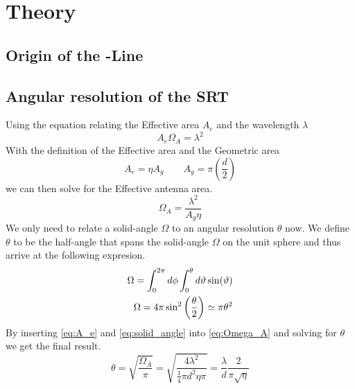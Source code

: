 
\section{Theory}




\subsection[Origin of the HI-Line]{Origin of the -Line}

\subsection{Angular resolution of the SRT}
Using the equation relating the Effective area $A_e$ and the wavelength $\lambda$ \cite[p. 149 (7.11)]{wilson}
\begin{equation}
    A_e \Omega_A = \lambda^2
\end{equation}
With the definition of the Effective area and the Geometric area
\begin{equation}
    A_e = \eta A_g \qquad A_g = \pi \left( \frac{d}{2} \right) \label{eq:A_e}
\end{equation}
we can then solve for the Effective antenna area.
\begin{equation}
    \Omega_A = \frac{\lambda^2}{A_g \eta} \label{eq:Omega_A}
\end{equation}
We only need to relate a solid-angle $\Omega$ to an angular resolution $\theta$ now. We define $\theta$ to be the half-angle that spans the solid-angle $\Omega$ on the unit sphere and thus arrive at the following expresion.
\begin{align}
    \Omega = \int_{0}^{2\pi} d\phi \int_{0}^{\theta} d\vartheta \sin(\vartheta) \notag \\
    \Omega = 4 \pi \sin^2 \left( \frac{\theta}{2} \right) \simeq \pi \theta^2 \label{eq:solid_angle}
\end{align}
By inserting \eqref{eq:A_e} and \eqref{eq:solid_angle} into \eqref{eq:Omega_A} and solving for $\theta$ we get the final result.
\begin{equation}
    \theta = \sqrt{\frac{\Omega_A}{\pi}} = \sqrt{\frac{4\lambda^2}{\frac{1}{4} \pi d^2 \eta \pi}} = \frac{\lambda}{d} \frac{2}{\pi \sqrt{\eta}}
\end{equation}

